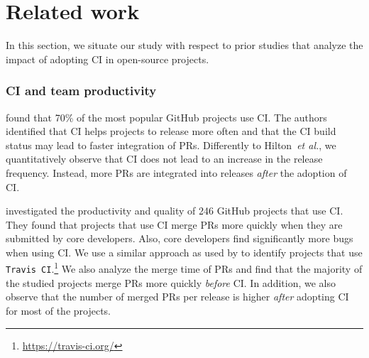 \section{Related work}
\label{sec_related_work}

In this section, we situate our study with respect to prior studies that analyze the impact of adopting CI in open-source projects.

\subsubsection*{\textbf{CI and team productivity}}

\cite{Hilton2016-xy} found that 70\%
of the most popular GitHub projects use CI. The authors identified that CI helps
projects to release more often and that the CI build status may lead to faster integration of PRs. Differently to Hilton~\textit{et al.}, we
quantitatively observe that CI does not lead to an increase in the release frequency. Instead, more PRs are integrated into releases \textit{after} the adoption of
CI.

\cite{Vasilescu2015-tn} investigated the productivity
and quality of 246 GitHub projects that use CI. They found that projects that
use CI merge PRs more quickly when they are submitted by core developers. Also,
core developers find significantly more bugs when using CI. We use a similar
approach as used by \cite{Vasilescu2015-tn} to
identify projects that use \texttt{Travis CI}.\footnote{\url{https://travis-ci.org/}}  We also analyze the merge time of PRs and
find that the majority of the studied projects merge PRs more quickly
\textit{before} CI. In addition, we also observe that the number of merged PRs
per release is higher \textit{after} adopting CI for most of the projects.  

